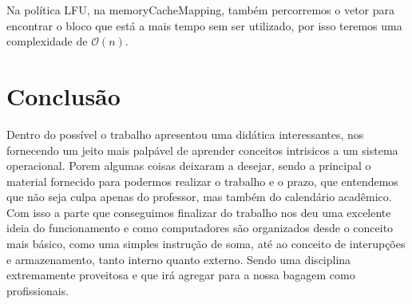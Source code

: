 \documentclass{article}
\begin{document}
Na política LFU, na memoryCacheMapping, também percorremos o vetor para encontrar o bloco que está a mais tempo sem ser utilizado, por isso 
teremos uma complexidade de $\mathcal{O}(n)$.

\clearpage
\section{Conclusão}
Dentro do possível o trabalho apresentou uma didática interessantes, nos fornecendo um jeito mais palpável
de aprender conceitos intrisicos a um sistema operacional. Porem algumas coisas deixaram a desejar, sendo a principal o material fornecido para 
podermos realizar o trabalho e o prazo, que entendemos que não seja culpa apenas do professor, mas também do calendário acadêmico. Com isso a parte que conseguimos
finalizar do trabalho nos deu uma excelente ideia do funcionamento e como computadores são organizados desde o conceito mais básico, como uma simples instrução de soma, até
ao conceito de interupções e armazenamento, tanto interno quanto externo. Sendo uma disciplina extremamente proveitosa e que irá agregar para a nossa bagagem como profissionais.
\end{document}
